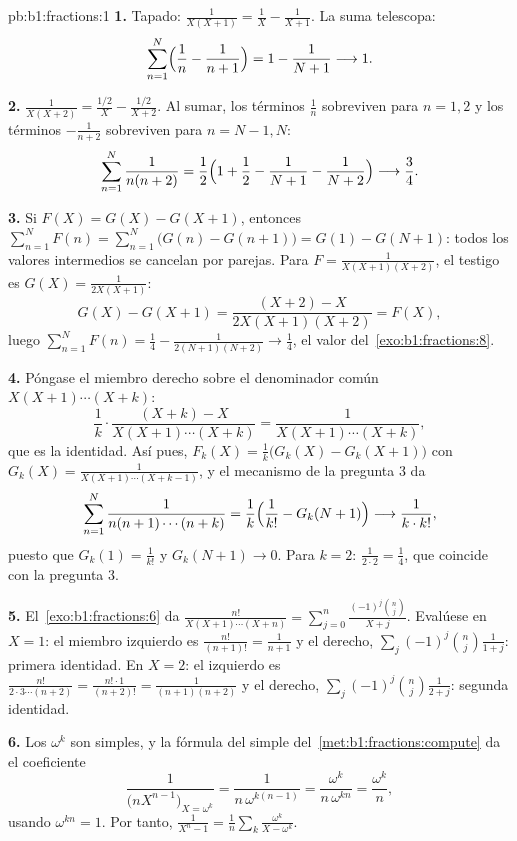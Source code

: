 \begin{solution}{pb:b1:fractions:1}
\textbf{1.} Tapado: $\frac1{X(X+1)} = \frac1X - \frac1{X+1}$. La suma
telescopa:
\[
\sum_{n=1}^{N}\Bigl(\frac1n - \frac1{n+1}\Bigr)
= 1 - \frac1{N+1} \longrightarrow 1 .
\]

\textbf{2.} $\frac1{X(X+2)} = \frac{1/2}X - \frac{1/2}{X+2}$. Al sumar,
los términos $\frac1n$ sobreviven para $n = 1, 2$ y los términos
$-\frac1{n+2}$ sobreviven para $n = N-1, N$:
\[
\sum_{n=1}^{N}\frac1{n(n+2)}
= \frac12\Bigl(1 + \frac12 - \frac1{N+1} - \frac1{N+2}\Bigr)
\longrightarrow \frac34 .
\]

\textbf{3.} Si $F(X) = G(X) - G(X+1)$, entonces
$\sum_{n=1}^N F(n) = \sum_{n=1}^N\bigl(G(n) - G(n+1)\bigr) = G(1) -
G(N+1)$: todos los valores intermedios se cancelan por parejas. Para
$F = \frac1{X(X+1)(X+2)}$, el testigo es $G(X) = \frac1{2X(X+1)}$:
\[
G(X) - G(X+1)
= \frac{(X+2) - X}{2X(X+1)(X+2)} = F(X) ,
\]
luego $\sum_{n=1}^N F(n) = \frac14 - \frac1{2(N+1)(N+2)} \to \frac14$,
el valor del~\cref{exo:b1:fractions:8}.

\textbf{4.} Póngase el miembro derecho sobre el denominador común
$X(X+1)\cdots(X+k)$:
\[
\frac1k\cdot\frac{(X + k) - X}{X(X+1)\cdots(X+k)}
= \frac{1}{X(X+1)\cdots(X+k)} ,
\]
que es la identidad. Así pues,
$F_k(X) = \frac1k\bigl(G_k(X) - G_k(X+1)\bigr)$ con
$G_k(X) = \frac1{X(X+1)\cdots(X+k-1)}$, y el mecanismo de la pregunta 3 da
\[
\sum_{n=1}^{N}\frac1{n(n+1)\cdots(n+k)}
= \frac1k\Bigl(\frac1{k!} - G_k(N+1)\Bigr)
\longrightarrow \frac1{k\cdot k!} ,
\]
puesto que $G_k(1) = \frac1{k!}$ y $G_k(N+1) \to 0$. Para $k = 2$:
$\frac1{2\cdot2} = \frac14$, que coincide con la pregunta 3.

\textbf{5.} El~\cref{exo:b1:fractions:6} da
$\frac{n!}{X(X+1)\cdots(X+n)} = \sum_{j=0}^n
\frac{(-1)^j\binom nj}{X + j}$. Evalúese en $X = 1$: el miembro
izquierdo es $\frac{n!}{(n+1)!} = \frac1{n+1}$ y el derecho,
$\sum_j(-1)^j\binom nj\frac1{1+j}$: primera identidad. En $X = 2$: el
izquierdo es $\frac{n!}{2\cdot3\cdots(n+2)} = \frac{n!\cdot1}{(n+2)!} =
\frac1{(n+1)(n+2)}$ y el derecho,
$\sum_j(-1)^j\binom nj\frac1{2+j}$: segunda identidad.

\textbf{6.} Los  $\omega^k$ son simples, y la fórmula del
 simple del~\cref{met:b1:fractions:compute} da el coeficiente
\[
\frac{1}{\bigl(nX^{n-1}\bigr)_{X = \omega^k}}
= \frac{1}{n\,\omega^{k(n-1)}}
= \frac{\omega^k}{n\,\omega^{kn}} = \frac{\omega^k}n ,
\]
usando $\omega^{kn} = 1$. Por tanto,
$\frac1{X^n-1} = \frac1n\sum_k \frac{\omega^k}{X - \omega^k}$.


\end{solution}
